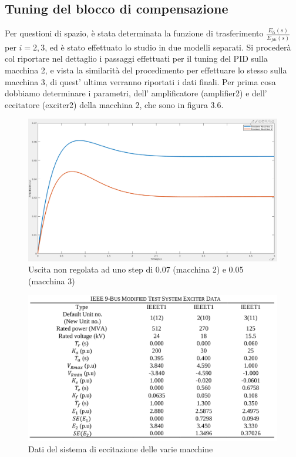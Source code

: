\documentclass[Lau,noexaminfo]{sapthesis}
\begin{document}
	\subsection{Tuning del blocco di compensazione}
	Per questioni di spazio, è stata determinata la funzione di trasferimento $\frac{E_{ti}(s)}{E_{fdi}(s)}$ per $i=2,3$, ed è stato effettuato lo studio in due modelli separati. Si procederà col riportare nel dettaglio i passaggi effettuati per il tuning del PID sulla macchina 2, e vista la similarità del procedimento per effettuare lo stesso sulla macchina 3, di quest' ultima verranno riportati i dati finali.
	Per prima cosa dobbiamo determinare i parametri, dell' amplificatore (amplifier2) e dell' eccitatore (exciter2) della macchina 2, che sono in figura 3.6.
	\begin{figure}
	\centering
	\includegraphics[height=0.35\textheight]{Sistema_non_regolato}
	\caption{Uscita non regolata ad uno step di 0.07 (macchina 2) e 0.05 (macchina 3)}
	\end{figure}	
	\begin{figure}
	 	\centering
	 	\includegraphics[height=0.3\textheight]{Dati_Sistema_Eccitazione}	 	\caption{Dati del sistema di eccitazione delle varie macchine}
	\end{figure}
\end{document}
